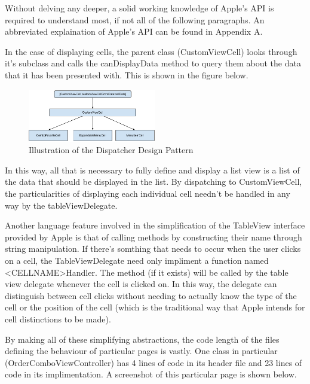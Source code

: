 \documentclass[se]{uw-wkrpt}
\begin{document}
Without delving any deeper, a solid working knowledge of Apple's API is required to understand
most, if not all of the following paragraphs. An abbreviated explaination of Apple's API can 
be found in Appendix A.

In the case of displaying cells, the parent class (CustomViewCell) looks through it's subclass
and calls the canDisplayData method to query them about the data that it has been presented with.
This is shown in the figure below.

\begin{figure}[h!]
  \caption{Illustration of the Dispatcher Design Pattern}
  \centering
    \includegraphics[width=0.5\textwidth]{customViewCellFlowchart}
\end{figure}

In this way, all that is necessary to fully define and display a list view is a list of the data
that should be displayed in the list. By dispatching to CustomViewCell, the particularities of
displaying each individual cell needn't be handled in any way by the tableViewDelegate. 

Another language feature involved in the simplification of the TableView interface provided
by Apple is that of calling methods by constructing their name through string manipulation.
If there's somthing that needs to occur when the user clicks on a cell, the TableViewDelegate
need only impliment a function named <CELLNAME>Handler. The method (if it exists) will be called
by the table view delegate whenever the cell is clicked on. In this way, the delegate can 
distinguish between cell clicks without needing to actually know the type of the cell or the
position of the cell (which is the traditional way that Apple intends for cell distinctions to
be made). 

By making all of these simplifying abstractions, the code length of the files defining
the behaviour of particular pages is vastly. One class in particular (OrderComboViewController)
has 4 lines of code in its header file and 23 lines of code in its implimentation. A screenshot
of this particular page is shown below. 
\end{document}
